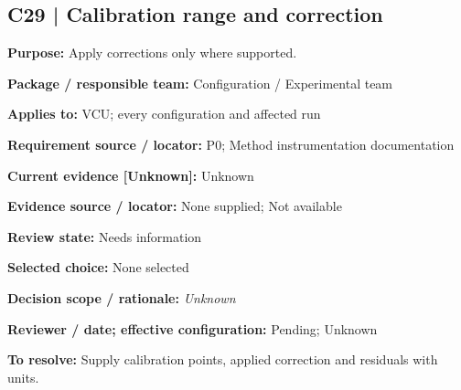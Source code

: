 \documentclass[11pt]{article}
\begin{document}
\par\noindent\begin{minipage}{\textwidth}\small\setlength{\parskip}{2pt}
\subsection*{C29 | Calibration range and correction}
\textbf{Purpose:} Apply corrections only where supported.\par
\textbf{Package / responsible team:} Configuration / Experimental team\par
\textbf{Applies to:} VCU; every configuration and affected run\par
\textbf{Requirement source / locator:} P0; Method instrumentation documentation\par
\textbf{Current evidence [Unknown]:} Unknown\par
\textbf{Evidence source / locator:} None supplied; Not available\par
\textbf{Review state:} Needs information\par
\textbf{Selected choice:} None selected\par
\textbf{Decision scope / rationale:} \textit{Unknown}\par
\textbf{Reviewer / date; effective configuration:} Pending; Unknown\par
\textbf{To resolve:} Supply calibration points, applied correction and residuals with units.\par
\end{minipage}\par\vspace{5pt}
\end{document}

